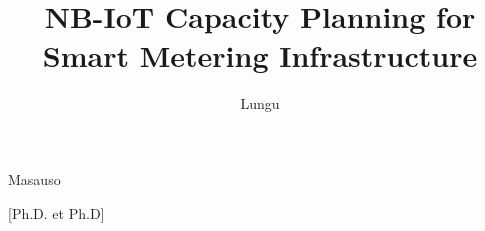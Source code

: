 
\usepackage[
  english,			%
	semestral,		%
  center,			%
]{thesis}   %


\author[Bc.]{Lungu}{Masauso}


[Ph.D. et Ph.D]


\title{NB-IoT Capacity Planning for Smart Metering Infrastructure}

